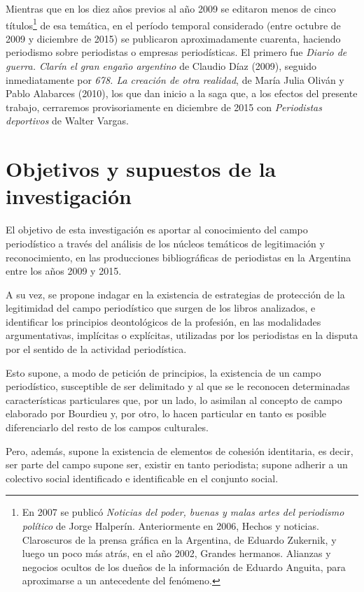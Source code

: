 Mientras que en los diez años previos al año 2009 se editaron menos de cinco títulos\footnote{En 2007 se publicó \emph{Noticias del poder, buenas y malas artes del periodismo político} de Jorge Halperín. Anteriormente en 2006, Hechos y noticias. Claroscuros de la prensa gráfica en la Argentina, de Eduardo Zukernik, y luego un poco más atrás, en el año 2002, Grandes hermanos. Alianzas y negocios ocultos de los dueños de la información de Eduardo Anguita, para aproximarse a un antecedente del fenómeno.} de esa temática, en el período temporal considerado (entre octubre de 2009 y diciembre de 2015) se publicaron aproximadamente cuarenta, haciendo periodismo sobre periodistas o empresas periodísticas. El primero fue \emph{Diario de guerra. Clarín el gran engaño argentino} de Claudio Díaz (2009), seguido inmediatamente por \emph{678. La creación de otra realidad}, de María Julia Oliván y Pablo Alabarces (2010), los que dan inicio a la saga que, a los efectos del presente trabajo, cerraremos provisoriamente en diciembre de 2015 con \emph{Periodistas deportivos} de Walter Vargas.

\section{Objetivos y supuestos de la investigación}

El objetivo de esta investigación es aportar al conocimiento del campo periodístico a través del análisis de los núcleos temáticos de legitimación y reconocimiento, en las producciones bibliográficas de periodistas en la Argentina entre los años 2009 y 2015.

A su vez, se propone indagar en la existencia de estrategias de protección de la legitimidad del campo periodístico que surgen de los libros analizados, e identificar los principios deontológicos de la profesión, en las modalidades argumentativas, implícitas o explícitas, utilizadas por los periodistas en la disputa por el sentido de la actividad periodística.

Esto supone, a modo de petición de principios, la existencia de un campo periodístico, susceptible de ser delimitado y al que se le reconocen determinadas características particulares que, por un lado, lo asimilan al concepto de campo elaborado por Bourdieu y, por otro, lo hacen particular en tanto es posible diferenciarlo del resto de los campos culturales.

Pero, además, supone la existencia de elementos de cohesión identitaria, es decir, ser parte del campo supone ser, existir en tanto periodista; supone adherir a un colectivo social identificado e identificable en el conjunto social.

